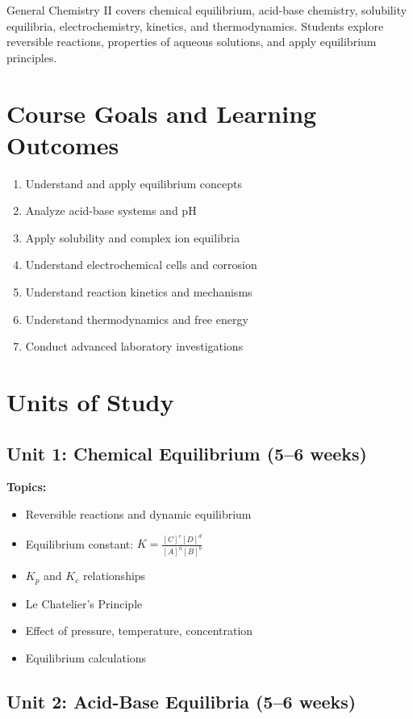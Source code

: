 \documentclass[12pt,oneside]{book}
\begin{document}
General Chemistry II covers chemical equilibrium, acid-base chemistry, solubility equilibria, electrochemistry, kinetics, and thermodynamics. Students explore reversible reactions, properties of aqueous solutions, and apply equilibrium principles.

\section{Course Goals and Learning Outcomes}

\begin{enumerate}
    \item Understand and apply equilibrium concepts
    \item Analyze acid-base systems and pH
    \item Apply solubility and complex ion equilibria
    \item Understand electrochemical cells and corrosion
    \item Understand reaction kinetics and mechanisms
    \item Understand thermodynamics and free energy
    \item Conduct advanced laboratory investigations
\end{enumerate}

\section{Units of Study}

\subsection{Unit 1: Chemical Equilibrium (5--6 weeks)}

\textbf{Topics:}
\begin{itemize}
    \item Reversible reactions and dynamic equilibrium
    \item Equilibrium constant: $K = \frac{[C]^c[D]^d}{[A]^a[B]^b}$
    \item $K_p$ and $K_c$ relationships
    \item Le Chatelier's Principle
    \item Effect of pressure, temperature, concentration
    \item Equilibrium calculations
\end{itemize}

\subsection{Unit 2: Acid-Base Equilibria (5--6 weeks)}
\end{document}
